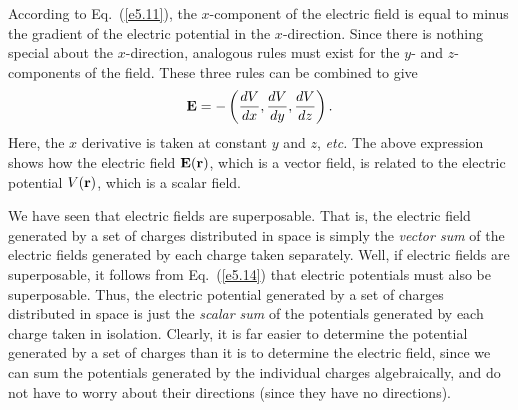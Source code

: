 According to Eq.~(\ref{e5.11}), the $x$-component of the electric field is equal
to minus the gradient of the electric potential in the $x$-direction.
Since there is nothing special about the $x$-direction, analogous rules
must exist for the $y$- and $z$-components of the field. 
These three rules can be combined to give
\begin{equation}\label{e5.14}
{\bf E} = - \left(\frac{dV}{dx}, 
\frac{dV}{dy}, \frac{dV}{dz}
\right).
\end{equation}
Here, the $x$ derivative is taken at constant $y$ and $z$, {\em etc.}
The above expression shows how the electric field ${\bf E}({\bf r})$, which is a vector field, is related to the electric
potential $V({\bf r})$, which is a scalar field. 

We have seen that electric fields are superposable. That is, the electric
field generated by a set of charges distributed in space is
simply the {\em vector sum} of the electric fields generated by each charge
taken separately. Well, if electric fields are superposable, it follows
from Eq.~(\ref{e5.14}) that electric potentials must also be superposable. Thus,
the electric potential generated by a set of charges distributed in space
is just the {\em scalar sum} of the potentials generated by each charge taken in isolation. Clearly, it is far easier to determine the potential generated by a set
of charges than it is to determine the electric field, since we can 
sum the potentials
generated by the individual charges algebraically, and do not have to worry about
their directions (since they have no directions). 
 


